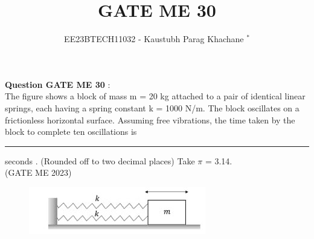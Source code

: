 \documentclass[journal,12pt,twocolumn]{IEEEtran}
\theoremstyle{remark}
\begin{document}

\vspace{3cm}

\Large\title{GATE ME 30}
\large\author{EE23BTECH11032 - Kaustubh Parag Khachane $^{*}$%
}
\maketitle
\newpage
\bigskip

\renewcommand{\thefigure}{\theenumi}
\renewcommand{\thetable}{\theenumi}
\large\textbf{Question GATE ME 30} :\\
The figure shows a block of mass m = 20 kg attached to a pair of identical linear springs, each having a spring constant k = 1000 N/m. The block oscillates on a frictionless horizontal surface. Assuming free vibrations, the time taken by the block to complete ten oscillations is \rule{1cm}{0.15mm} seconds . (Rounded off to two decimal places) Take $\pi$ = 3.14. \\ \hfill(GATE ME 2023)

\begin{figure}[!ht]
\centering
\begin{center}
\includegraphics[width=\columnwidth]{2023/ME/30/figs/questiondiagram.jpg}
\end{center}
\end{figure}
\end{document}
